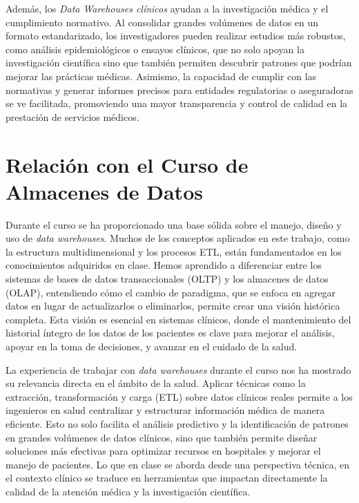 \documentclass[12pt, a4paper, twoside]{article}
\begin{document}
	Además, los \textit{Data Warehouses clínicos} ayudan a la investigación médica y el cumplimiento normativo. Al consolidar grandes volúmenes de datos en un formato estandarizado, los investigadores pueden realizar estudios más robustos, como análisis epidemiológicos o ensayos clínicos, que no solo apoyan la investigación científica sino que también permiten descubrir patrones que podrían mejorar las prácticas médicas. Asimismo, la capacidad de cumplir con las normativas y generar informes precisos para entidades regulatorias o aseguradoras se ve facilitada, promoviendo una mayor transparencia y control de calidad en la prestación de servicios médicos.
	
	
	\section{Relación con el Curso de Almacenes de Datos}
	
	Durante el curso se ha proporcionado una base sólida sobre el manejo, diseño y uso de \textit{data warehouses}. Muchos de los conceptos aplicados en este trabajo, como la estructura multidimensional y los procesos ETL, están fundamentados en los conocimientos adquiridos en clase. Hemos aprendido a diferenciar entre los sistemas de bases de datos transaccionales (OLTP) y los almacenes de datos (OLAP), entendiendo cómo el cambio de paradigma, que se enfoca en agregar datos en lugar de actualizarlos o eliminarlos, permite crear una visión histórica completa. Esta visión es esencial en sistemas clínicos, donde el mantenimiento del historial íntegro de los datos de los pacientes es clave para mejorar el análisis, apoyar en la toma de decisiones, y avanzar en el cuidado de la salud.
	
	La experiencia de trabajar con \textit{data warehouses} durante el curso nos ha mostrado su relevancia directa en el ámbito de la salud. Aplicar técnicas como la extracción, transformación y carga (ETL) sobre datos clínicos reales permite a los ingenieros en salud centralizar y estructurar información médica de manera eficiente. Esto no solo facilita el análisis predictivo y la identificación de patrones en grandes volúmenes de datos clínicos, sino que también permite diseñar soluciones más efectivas para optimizar recursos en hospitales y mejorar el manejo de pacientes. Lo que en clase se aborda desde una perspectiva técnica, en el contexto clínico se traduce en herramientas que impactan directamente la calidad de la atención médica y la investigación científica.
	
\end{document}
